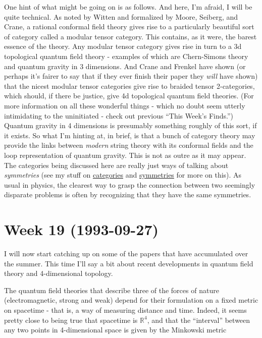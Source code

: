 \documentclass{article}
\begin{document}
One hint of what might be going on is as follows. And here, I'm afraid,
I will be quite technical. As noted by Witten and formalized by Moore,
Seiberg, and Crane, a rational conformal field theory gives rise to a
particularly beautiful sort of category called a modular tensor
category. This contains, as it were, the barest essence of the theory.
Any modular tensor category gives rise in turn to a 3d topological
quantum field theory - examples of which are Chern-Simons theory and
quantum gravity in 3 dimensions. And Crane and Frenkel have shown (or
perhaps it's fairer to say that if they ever finish their paper they
\emph{will} have shown) that the nicest modular tensor categories give
rise to braided tensor 2-categories, which should, if there be justice,
give 4d topological quantum field theories. (For more information on all
these wonderful things - which no doubt seem utterly intimidating to the
uninitiated - check out previous ``This Week's Finds.'') Quantum gravity
in 4 dimensions is presumably something roughly of this sort, if it
exists. So what I'm hinting at, in brief, is that a bunch of category
theory may provide the links between \emph{modern} string theory with
its conformal fields and the loop representation of quantum gravity.
This is not as outre as it may appear. The categories being discussed
here are really just ways of talking about \emph{symmetries} (see my
stuff on
\href{http://math.ucr.edu/home/baez/categories.html}{categories} and
\href{http://math.ucr.edu/home/baez/symmetries.html}{symmetries} for
more on this). As usual in physics, the clearest way to grasp the
connection between two seemingly disparate problems is often by
recognizing that they have the same symmetries.
\hypertarget{week-19-1993-09-27}{%
\section{Week 19 (1993-09-27)}\label{week-19-1993-09-27}}

I will now start catching up on some of the papers that have accumulated
over the summer. This time I'll say a bit about recent developments in
quantum field theory and 4-dimensional topology.

The quantum field theories that describe three of the forces of nature
(electromagnetic, strong and weak) depend for their formulation on a
fixed metric on spacetime - that is, a way of measuring distance and
time. Indeed, it seems pretty close to being true that spacetime is
\(\mathbb{R}^4\), and that the ``interval'' between any two points in
4-dimensional space is given by the Minkowski metric
\end{document}
